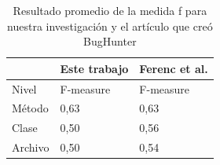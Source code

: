 \begin{table}[H]
\captionsetup{labelsep=period, labelfont=bf}
\caption{\label{table:original_result_average} Resultado promedio de la medida f para nuestra investigación y el artículo que creó BugHunter }
\centering
\begin{tabular}{lll}
\toprule
       & Este trabajo       & Ferenc et al.     \\
\midrule
Nivel  & F-measure & F-measure \\
\hline
Método & 0,63      & 0,63      \\
Clase  & 0,50      & 0,56      \\
Archivo   & 0,50      & 0,54    \\
\bottomrule
\end{tabular}

\end{table}